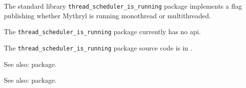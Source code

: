 
The standard library {\tt thread\_scheduler\_is\_running} package implements a flag publishing whether Mythryl is running monothread or multithreaded.

The {\tt thread\_scheduler\_is\_running} package currently has no api.

The {\tt thread\_scheduler\_is\_running} package source code is in .

See also:  package.

See also:  package.

